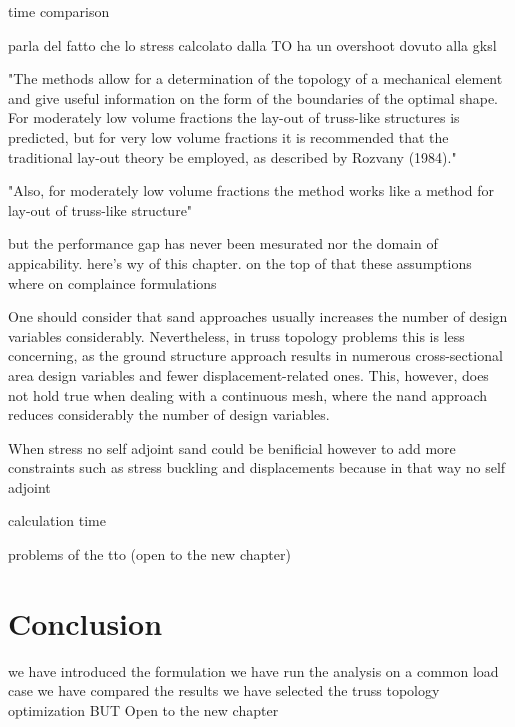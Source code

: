 time comparison

parla del fatto che lo stress calcolato dalla TO ha un overshoot dovuto alla gksl

"The methods allow for a determination of the topology of a mechanical element and give useful information on the form of the boundaries of the optimal shape. For moderately low volume fractions the lay-out of truss-like structures is predicted, but for very low volume fractions it is recommended that the traditional lay-out theory be employed, as described by Rozvany (1984)." 

"Also, for moderately low volume fractions the method works like a method for lay-out of truss-like structure" 

but the performance gap has never been mesurated nor the domain of appicability. here's wy of this chapter. on the top of that these assumptions where on complaince formulations

One should consider that \gls{sand} approaches usually increases the number of design variables considerably. Nevertheless, in truss topology problems this is less concerning, as the ground structure approach results in numerous cross-sectional area design variables and fewer displacement-related ones. This, however, does not hold true when dealing with a continuous mesh, where the \gls{nand} approach reduces considerably the number of design variables.

When stress no self adjoint \gls{sand} could be benificial however to add more constraints such as stress buckling and displacements because in that way no self adjoint

calculation time

problems of the tto (open to the new chapter)

\section{Conclusion}
we have introduced the formulation
we have run the analysis on a common load case
we have compared the results
we have selected the truss topology optimization
BUT
Open to the new chapter
